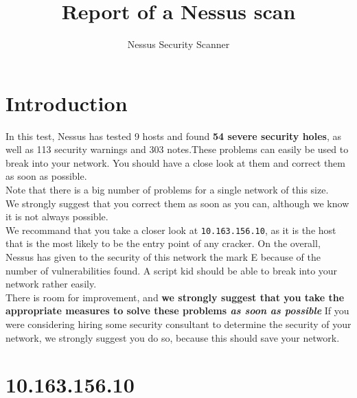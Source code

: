 \documentclass{article}
\title{\vspace*{100pt}\Huge Report of a Nessus scan\normalsize}
\author{Nessus Security Scanner}
\begin{document}
\maketitle
\newpage
\tableofcontents
\newpage
\section*{Introduction}
In this test, Nessus has tested 9 hosts and found \textbf{54 severe security holes}, as well as 113 security warnings and 303 notes.These problems can easily be used to break into your network. You should have a close look at them and correct them as soon as possible.\\
Note that there is a big number of problems for a single network of this size.\\
We strongly suggest that you correct them as soon as you can, although we know it is not always possible.\\
We recommand that you take a closer look at \verb+10.163.156.10+, as it is the host that is the most likely to be the entry point of any cracker.
On the overall, Nessus has given to the security of this network the mark E because of the number of vulnerabilities found. A script kid should be able to break into your network rather easily.\\
There is room for improvement, and \textbf{we strongly suggest that you take the appropriate measures to solve these problems \textit{as soon as possible}}
If you were considering hiring some security consultant to determine the security of your network, we strongly suggest you do so, because this should save your network.
\newpage
\section{10.163.156.10}
\end{document}
